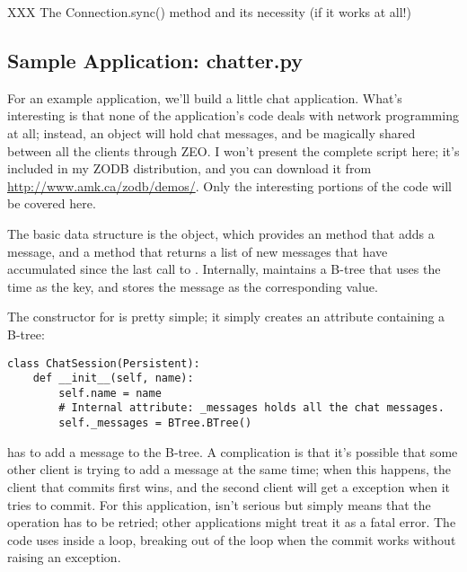 XXX The Connection.sync() method and its necessity (if it works at all!) 





\subsection{Sample Application: chatter.py}

For an example application, we'll build a little chat application.
What's interesting is that none of the application's code deals with
network programming at all; instead, an object will hold chat
messages, and be magically shared between all the clients through ZEO.
I won't present the complete script here; it's included in my ZODB
distribution, and you can download it from
\url{http://www.amk.ca/zodb/demos/}.  Only the interesting portions of
the code will be covered here.

The basic data structure is the  object,
which provides an  method that adds a
message, and a  method that returns a list
of new messages that have accumulated since the last call to
.  Internally, 
maintains a B-tree that uses the time as the key, and stores the
message as the corresponding value.

The constructor for  is pretty simple; it simply
creates an attribute containing a B-tree:

\begin{verbatim}
class ChatSession(Persistent):
    def __init__(self, name):
        self.name = name
        # Internal attribute: _messages holds all the chat messages.        
        self._messages = BTree.BTree()        
\end{verbatim}

 has to add a message to the
 B-tree.  A complication is that it's possible
that some other client is trying to add a message at the same time;
when this happens, the client that commits first wins, and the second
client will get a  exception when it tries to
commit.  For this application,  isn't serious
but simply means that the operation has to be retried; other
applications might treat it as a fatal error.  The code uses
 inside a  loop,
breaking out of the loop when the commit works without raising an
exception.


